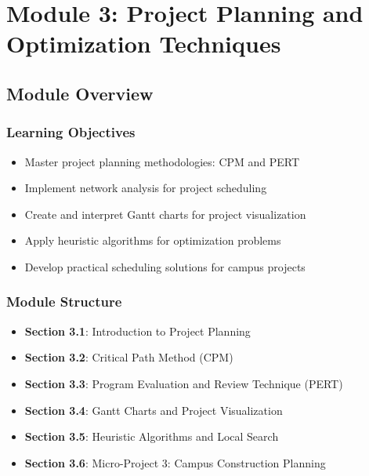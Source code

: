 \documentclass[
  letterpaper,
  DIV=11,
  numbers=noendperiod]{scrreprt}
\providecommand{\tightlist}{%
  \setlength{\itemsep}{0pt}\setlength{\parskip}{0pt}}
\begin{document}

\chapter{Module 3: Project Planning and Optimization
Techniques}\label{module-3-project-planning-and-optimization-techniques}

\section{Module Overview}\label{module-overview-2}

\subsection{Learning Objectives}\label{learning-objectives-3}

\begin{itemize}
\tightlist
\item
  Master project planning methodologies: CPM and PERT
\item
  Implement network analysis for project scheduling
\item
  Create and interpret Gantt charts for project visualization
\item
  Apply heuristic algorithms for optimization problems
\item
  Develop practical scheduling solutions for campus projects
\end{itemize}

\subsection{Module Structure}\label{module-structure-1}

\begin{itemize}
\tightlist
\item
  \textbf{Section 3.1}: Introduction to Project Planning
\item
  \textbf{Section 3.2}: Critical Path Method (CPM)
\item
  \textbf{Section 3.3}: Program Evaluation and Review Technique (PERT)
\item
  \textbf{Section 3.4}: Gantt Charts and Project Visualization
\item
  \textbf{Section 3.5}: Heuristic Algorithms and Local Search
\item
  \textbf{Section 3.6}: Micro-Project 3: Campus Construction Planning
\end{itemize}
\end{document}
